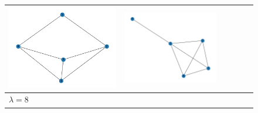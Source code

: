 \documentclass[11pt,a4paper,openright,oneside]{book}
\numberwithin{equation}{section}
\begin{document}
{\begin{figure}[h]
\begin{adjustwidth}{-3cm}{-3cm}
\begin{tabular}{>{\centering\arraybackslash}m{1.5cm} m{2.5cm} m{2.5cm} m{2.5cm} m{2.5cm} m{2.5cm}}
        \rule{0pt}{0.01cm} \includegraphics[width=\linewidth]{media/tnale/graph-4-tnale-4.png} \rule{0pt}{0.01cm}&
        \rule{0pt}{0.01cm} \includegraphics[width=\linewidth]{media/tnale/graph-5-tnale-4.png} \rule{0pt}{0.01cm}\\ \hline
        $\lambda = 8$ &

\end{tabular}
\end{adjustwidth}
\end{figure}}
\end{document}

